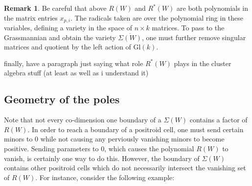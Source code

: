 \documentclass[11pt]{article}
\newtheorem{thm}{Theorem}[section]
\theoremstyle{remark}
\theoremstyle{definition}
\newtheorem{rmk}[thm]{Remark}
\begin{document}
\begin{rmk}
Be careful that above $R(W)$ and $R^{\ast}(W)$ are both polynomials in the matrix entries $x_{p,i}$. The radicals taken are over the polynomial ring in these variables, defining a variety in the space of $n \times k$ matrices. To pass to the Grassmannian and obtain the variety $\overline{\Sigma(W)}$, one must further remove singular matrices and quotient by the left action of $\mathrm{Gl}(k)$. 
\end{rmk}

{\color{red} finally, have a paragraph just saying what role $R^{\ast}(W)$ plays in the cluster algebra stuff (at least as well as i understand it)}


\subsection{Geometry of the poles}

Note that not every co-dimension one boundary of a $\Sigma(W)$ contains a factor of $R(W)$. In order to reach a boundary of a positroid cell, one must send certain minors to 0 while not causing any perviously vanishing minors to become positive. Sending parameters to $0$, which causes the polynomial $R(W)$ to vanish, is certainly one way to do this. However, the boundary of $\Sigma(W)$ contains other positroid cells which do not necessarily intersect the vanishing set of $R(W)$. For instance, consider the following example:
\end{document}
